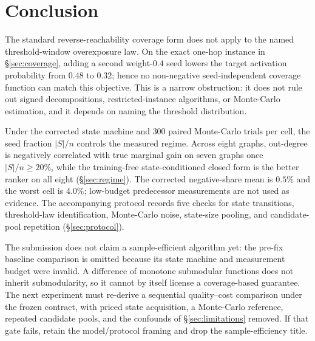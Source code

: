 \section{Conclusion}
\label{sec:conclusion}

The standard reverse-reachability coverage form does not apply to the named
threshold-window overexposure law. On the exact one-hop instance in \S\ref{sec:coverage}, adding a
second weight-$0.4$ seed lowers the target activation probability from $0.48$ to $0.32$; hence no
non-negative seed-independent coverage function can match this objective. This is a narrow
obstruction: it does not rule out signed decompositions, restricted-instance algorithms, or
Monte-Carlo estimation, and it depends on naming the threshold distribution.

Under the corrected state machine and $300$ paired Monte-Carlo trials per cell, the seed fraction
$|S|/n$ controls the measured regime. Across eight graphs, out-degree is negatively correlated with
true marginal gain on seven graphs once $|S|/n \ge 20\%$, while the training-free state-conditioned
closed form is the better ranker on all eight (\S\ref{sec:regime}). The corrected negative-share
mean is $0.5\%$ and the worst cell is $4.0\%$; low-budget predecessor measurements are not used as
evidence. The accompanying protocol records five checks for state transitions, threshold-law
identification, Monte-Carlo noise, state-size pooling, and candidate-pool repetition
(\S\ref{sec:protocol}).

The submission does not claim a sample-efficient algorithm yet: the pre-fix baseline comparison is
omitted because its state machine and measurement budget were invalid. A difference of monotone
submodular functions does not inherit submodularity, so it cannot by itself license a coverage-based
guarantee. The next experiment must re-derive a sequential quality--cost comparison under the
frozen contract, with priced state acquisition, a Monte-Carlo reference, repeated candidate pools,
and the confounds of \S\ref{sec:limitations} removed. If that gate fails, retain the model/protocol
framing and drop the sample-efficiency title.
